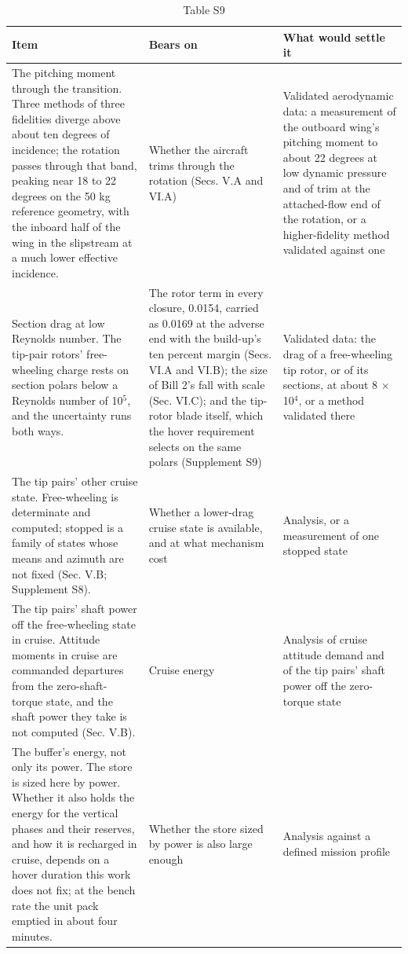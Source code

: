 \documentclass[journal]{new-aiaa}
\begin{document}
\begin{table}[htbp]
\centering
\caption*{Table S9}
\small
\begin{tabularx}{\linewidth}{XXX}
\hline
Item & Bears on & What would settle it \\ \hline
The pitching moment through the transition. Three methods of three fidelities diverge above about ten degrees of incidence; the rotation passes through that band, peaking near 18 to 22 degrees on the 50 kg reference geometry, with the inboard half of the wing in the slipstream at a much lower effective incidence. & Whether the aircraft trims through the rotation (Secs. V.A and VI.A) & Validated aerodynamic data: a measurement of the outboard wing's pitching moment to about 22 degrees at low dynamic pressure and of trim at the attached-flow end of the rotation, or a higher-fidelity method validated against one \\
Section drag at low Reynolds number. The tip-pair rotors' free-wheeling charge rests on section polars below a Reynolds number of 10$^5$, and the uncertainty runs both ways. & The rotor term in every closure, 0.0154, carried as 0.0169 at the adverse end with the build-up's ten percent margin (Secs. VI.A and VI.B); the size of Bill 2's fall with scale (Sec. VI.C); and the tip-rotor blade itself, which the hover requirement selects on the same polars (Supplement S9) & Validated data: the drag of a free-wheeling tip rotor, or of its sections, at about 8 $\times$ 10$^4$, or a method validated there \\
The tip pairs' other cruise state. Free-wheeling is determinate and computed; stopped is a family of states whose means and azimuth are not fixed (Sec. V.B; Supplement S8). & Whether a lower-drag cruise state is available, and at what mechanism cost & Analysis, or a measurement of one stopped state \\
The tip pairs' shaft power off the free-wheeling state in cruise. Attitude moments in cruise are commanded departures from the zero-shaft-torque state, and the shaft power they take is not computed (Sec. V.B). & Cruise energy & Analysis of cruise attitude demand and of the tip pairs' shaft power off the zero-torque state \\
The buffer's energy, not only its power. The store is sized here by power. Whether it also holds the energy for the vertical phases and their reserves, and how it is recharged in cruise, depends on a hover duration this work does not fix; at the bench rate the unit pack emptied in about four minutes. & Whether the store sized by power is also large enough & Analysis against a defined mission profile \\

\end{tabularx}
\end{table}
\end{document}
